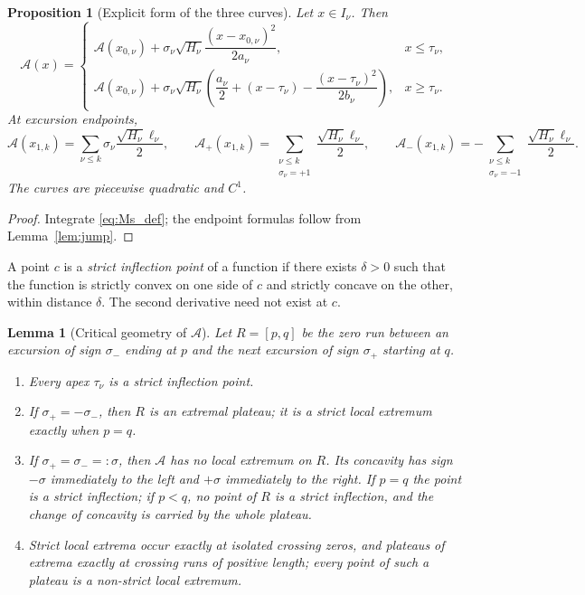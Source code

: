 \documentclass[11pt]{amsart}
\numberwithin{equation}{section}
\theoremstyle{plain}
\newtheorem{proposition}[theorem]{Proposition}
\newtheorem{lemma}[theorem]{Lemma}
\theoremstyle{definition}
\theoremstyle{remark}
\newcommand{\Ap}{\mathcal{A}_{+}}
\newcommand{\Am}{\mathcal{A}_{-}}
\newcommand{\Anet}{\mathcal{A}}
\begin{document}
\begin{proposition}[Explicit form of the three curves]
\label{prop:explicit}
Let $x\in I_\nu$. Then
\begin{equation}
\label{eq:explicit_A}
\Anet(x)=
\begin{cases}
\Anet(x_{0,\nu})+\sigma_\nu\sqrt{H_\nu}
\dfrac{(x-x_{0,\nu})^2}{2a_\nu},&x\le\tau_\nu,\\[2ex]
\Anet(x_{0,\nu})+\sigma_\nu\sqrt{H_\nu}
\left(\dfrac{a_\nu}{2}+(x-\tau_\nu)-
\dfrac{(x-\tau_\nu)^2}{2b_\nu}\right),&x\ge\tau_\nu.
\end{cases}
\end{equation}
At excursion endpoints,
\begin{equation}
\label{eq:explicit_net}
\Anet(x_{1,k})=\sum_{\nu\le k}\sigma_\nu\frac{\sqrt{H_\nu}\ell_\nu}{2},\qquad
\Ap(x_{1,k})=\sum_{\substack{\nu\le k\\\sigma_\nu=+1}}
\frac{\sqrt{H_\nu}\ell_\nu}{2},\qquad
\Am(x_{1,k})=-\sum_{\substack{\nu\le k\\\sigma_\nu=-1}}
\frac{\sqrt{H_\nu}\ell_\nu}{2}.
\end{equation}
The curves are piecewise quadratic and $C^1$.
\end{proposition}

\begin{proof}
Integrate \eqref{eq:Ms_def}; the endpoint formulas follow from
Lemma~\ref{lem:jump}.
\end{proof}

A point $c$ is a \emph{strict inflection point} of a function if there
exists $\delta>0$ such that the function is strictly convex on one side of
$c$ and strictly concave on the other, within distance $\delta$. The second
derivative need not exist at $c$.

\begin{lemma}[Critical geometry of $\Anet$]
\label{lem:critical}
Let $R=[p,q]$ be the zero run between an excursion of sign $\sigma_-$ ending
at $p$ and the next excursion of sign $\sigma_+$ starting at $q$.
\begin{enumerate}[label=\textup{(\roman*)}]
\item Every apex $\tau_\nu$ is a strict inflection point.
\item If $\sigma_+=-\sigma_-$, then $R$ is an extremal plateau; it is a
strict local extremum exactly when $p=q$.
\item If $\sigma_+=\sigma_-=:\sigma$, then $\Anet$ has no local extremum on
$R$. Its concavity has sign $-\sigma$ immediately to the left and $+\sigma$
immediately to the right. If $p=q$ the point is a strict inflection; if
$p<q$, no point of $R$ is a strict inflection, and the change of concavity
is carried by the whole plateau.
\item Strict local extrema occur exactly at isolated crossing zeros, and
plateaus of extrema exactly at crossing runs of positive length; every point
of such a plateau is a non-strict local extremum.
\end{enumerate}
\end{lemma}
\end{document}
